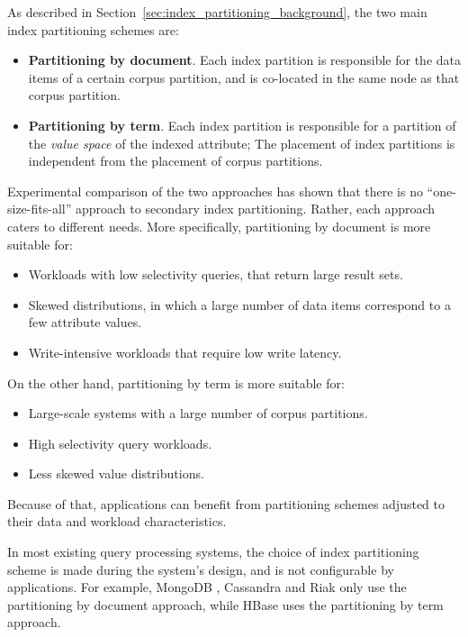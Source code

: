 As described in Section~\ref{sec:index_partitioning_background}, the two main index partitioning schemes are:
\begin{itemize}
  \item \textbf{Partitioning by document}.
  Each index partition is responsible for the data items of a certain corpus partition,
  and is co-located in the same node as that corpus partition.
  \item \textbf{Partitioning by term}.
  Each index partition is responsible for a partition of the \textit{value space} of the indexed attribute;
  The placement of index partitions is independent from the placement of corpus partitions.
\end{itemize}

Experimental comparison of the two approaches \cite{dsilva:tworings, kejriwal:slik} has shown that there is no ``one-size-fits-all'' approach to secondary index partitioning.
Rather, each approach caters to different needs.
More specifically, partitioning by document is more suitable for:
\begin{itemize}
  \item Workloads with low selectivity queries, that return large result sets.
  \item Skewed distributions, in which a large number of data items correspond to a few attribute values.
  \item Write-intensive workloads that require low write latency.
\end{itemize}
\noindent
On the other hand, partitioning by term is more suitable for:
\begin{itemize}
  \item Large-scale systems with a large number of corpus partitions.
  \item High selectivity query workloads.
  \item Less skewed value distributions.
\end{itemize}

Because of that, applications can benefit from partitioning schemes adjusted to their data and workload characteristics.

In most existing query processing systems,
the choice of index partitioning scheme is made during the system's design, and is not configurable
by applications.
For example, MongoDB \cite{coubase:mongoindexes}, Cassandra \cite{cassandra:secondaryindexing} and Riak \cite{riakv:secondaryindexes}
only use the partitioning by document approach,
while HBase \cite{hbase:secondaryindexes} uses the partitioning by term approach.

